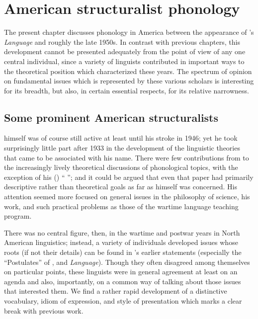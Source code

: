 \chapter{American structuralist phonology}
\label{ch.structuralists}

The present chapter discusses phonology in America between the
appearance of {\Bloomfield}'s \textsl{Language} and roughly the late 1950s. In
{contrast} with previous chapters, this development cannot be presented
adequately from the point of view of any one central individual, since a variety
of linguists contributed in important ways to the theoretical position
which characterized these years. The spectrum of opinion on
fundamental issues which is represented by these various scholars is
interesting for its breadth, but also, in certain essential respects,
for its relative narrowness.

\section{Some prominent American structuralists}

{\Bloomfield} himself was of course still active at least until his
stroke in 1946; yet he took surprisingly little part after 1933 in the
development of the linguistic theories that came to be associated with
his name. There were few contributions from {\Bloomfield} to the
increasingly lively theoretical discussions of phonological topics,
with the exception of his
(\citeyear{bloomfield:menomini_morphophonemics}) ``
''; and it could be argued that even that paper had
primarily descriptive rather than theoretical goals as far as
{\Bloomfield} himself was concerned. His attention seemed more focused on
general issues in the philosophy of science, his  work, and
such practical problems as those of the wartime language teaching
program.

There was no central figure, then, in the wartime and postwar years in
North American linguistics; instead, a variety of individuals
developed issues whose roots (if not their details) can be found in
{\Bloomfield}'s earlier statements (especially the ``Postulates'' of
\citeyear{bloomfield26:postulates}, and \textsl{Language}). Though
they often disagreed among themselves on particular points, these
linguists were in general agreement at least on an agenda and also,
importantly, on a common way of talking about those issues that
interested them. We find a rather rapid development of a distinctive
vocabulary, idiom of expression, and style of presentation which marks
a clear break with previous work.

